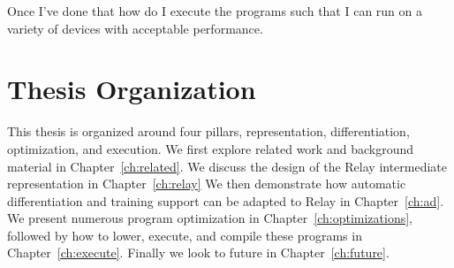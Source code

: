 Once I've done that how do I execute the programs such that I can run
  on a variety of devices with acceptable performance.


\section{Thesis Organization}

This thesis is organized around four pillars, representation, differentiation, optimization, and execution.
We first explore related work and background material in Chapter~\ref{ch:related}.
We discuss the design of the Relay intermediate representation in Chapter~\ref{ch:relay}
We then demonstrate how automatic differentiation and training support can be adapted to Relay in Chapter~\ref{ch:ad}.
We present numerous program optimization in Chapter~\ref{ch:optimizations},
  followed by how to lower, execute, and compile these programs in
  Chapter~\ref{ch:execute}.
Finally we look to future in Chapter~\ref{ch:future}.

